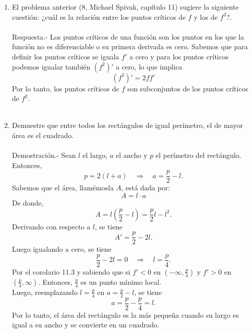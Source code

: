 \begin{enumerate}[\bfseries 1.]
\begin{enumerate}[(a)]
	\end{enumerate}

    \item El problema anterior (8, Michael Spivak, capítulo 11) sugiere la siguiente cuestión: ¿cuál es la relación entre los puntos críticos de $f$ y los de $f^2$?.\\\\
	Respuesta.-\; Los puntos críticos de una función son los puntos en los que la función no es diferenciable o su primera derivada es cero. Sabemos que para definir los puntos críticos se iguala  $f'$ a cero y para los puntos críticos podemos igualar también $\left(f^2\right)'$ a cero, lo que implica
	$$\left(f^2\right)'=2ff'$$
	Por lo tanto, los puntos críticos de $f$ son subconjuntos de los puntos críticos de $f^2$.\\\\

    \item Demuestre que entre todos los rectángulos de igual perímetro, el de mayor área es el cuadrado.\\\\
	Demostración.-\; Sean $l$ el largo, $a$ el ancho y $p$ el perímetro del rectángulo. Entonces,
	$$p=2(l+a)\quad \Rightarrow \quad a=\dfrac{p}{2}-l.$$
	Sabemos que el área, llamémosla $A$, está dada por:
	$$A=l \cdot a$$
	De donde,
	$$A=l\left(\dfrac{p}{2}-l\right)=\dfrac{p}{2}l-l^2.$$
	Derivando con respecto a $l$, se tiene
	$$A'=\dfrac{p}{2}-2l.$$
	Luego igualando a cero, se tiene
	$$\dfrac{p}{2}-2l=0\quad \Rightarrow \quad l=\dfrac{p}{4}.$$
	Por el corolario 11.3 y sabiendo que si $f'<0$ en $\left(-\infty,\frac{p}{4}\right)$  y $f'>0$ en $\left(\frac{p}{4},\infty\right)$. Entonces, $\frac{p}{4}$ es un punto mínimo local.\\

	Luego, reemplazando $l=\frac{p}{4}$ en $a=\frac{p}{2}-l$, se tiene
	$$a=\dfrac{p}{2}-\frac{p}{4}=l.$$
	Por lo tanto, el área del rectángulo es la más pequeña cuando su largo es igual a su ancho y se convierte en un cuadrado.\\\\


\end{enumerate}
